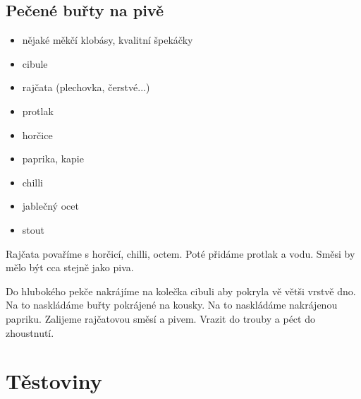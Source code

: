 \documentclass[10pt,a4paper]{article}
\newenvironment{myitemize}
{ \begin{itemize}
    \setlength{\itemsep}{0pt}
    \setlength{\parskip}{0pt}
    \setlength{\parsep}{0pt}     }
{ \end{itemize}                  }
\begin{document}
\subsection{Pečené buřty na pivě}
\begin{minipage}[t]{0,5\textwidth}
\begin{myitemize} 
\item nějaké měkčí klobásy, kvalitní špekáčky
\item cibule
\item rajčata (plechovka, čerstvé...)
\item protlak
\item horčice
\item paprika, kapie
\item chilli
\item jablečný ocet
\item stout
\end{myitemize}
\end{minipage}
\begin{minipage}[t]{0,5\textwidth}
Rajčata povaříme s horčicí, chilli, octem. Poté přidáme protlak a vodu. Směsi by mělo být cca stejně jako piva. 

Do hlubokého pekče nakrájíme na kolečka cibuli aby pokryla vě větši vrstvě dno. Na to naskládáme buřty pokrájené na kousky. Na to naskládáme nakrájenou papriku. Zalijeme rajčatovou směsí a pivem. Vrazit do trouby a péct do zhoustnutí.
\end{minipage}
\pagebreak
\section{Těstoviny}
\end{document}
